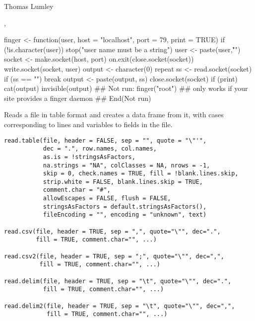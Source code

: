 %
\begin{Author}\relax
Thomas Lumley
\end{Author}
%
\begin{SeeAlso}\relax
{}, 
\end{SeeAlso}
%
\begin{Examples}
\begin{ExampleCode}
finger <- function(user, host = "localhost", port = 79, print = TRUE)
{
    if (!is.character(user))
        stop("user name must be a string")
    user <- paste(user,"\r\n")
    socket <- make.socket(host, port)
    on.exit(close.socket(socket))
    write.socket(socket, user)
    output <- character(0)
    repeat{
        ss <- read.socket(socket)
        if (ss == "") break
        output <- paste(output, ss)
    }
    close.socket(socket)
    if (print) cat(output)
    invisible(output)
}
## Not run: 
finger("root")  ## only works if your site provides a finger daemon
## End(Not run)
\end{ExampleCode}
\end{Examples}
%
\begin{Description}\relax
Reads a file in table format and creates a data frame from it, with
cases corresponding to lines and variables to fields in the file.
\end{Description}
%
\begin{Usage}
\begin{verbatim}
read.table(file, header = FALSE, sep = "", quote = "\"'",
           dec = ".", row.names, col.names,
           as.is = !stringsAsFactors,
           na.strings = "NA", colClasses = NA, nrows = -1,
           skip = 0, check.names = TRUE, fill = !blank.lines.skip,
           strip.white = FALSE, blank.lines.skip = TRUE,
           comment.char = "#",
           allowEscapes = FALSE, flush = FALSE,
           stringsAsFactors = default.stringsAsFactors(),
           fileEncoding = "", encoding = "unknown", text)

read.csv(file, header = TRUE, sep = ",", quote="\"", dec=".",
         fill = TRUE, comment.char="", ...)

read.csv2(file, header = TRUE, sep = ";", quote="\"", dec=",",
          fill = TRUE, comment.char="", ...)

read.delim(file, header = TRUE, sep = "\t", quote="\"", dec=".",
           fill = TRUE, comment.char="", ...)

read.delim2(file, header = TRUE, sep = "\t", quote="\"", dec=",",
            fill = TRUE, comment.char="", ...)
\end{verbatim}
\end{Usage}
